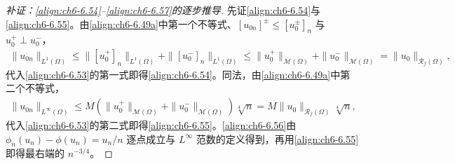 \documentclass[../../main.tex]{subfiles}%
\begin{document}
\begin{proof}[补证：\eqref{align:ch6-6.54}--\eqref{align:ch6-6.57}的逐步推导]
先证\eqref{align:ch6-6.54}与\eqref{align:ch6-6.55}。由\eqref{align:ch6-6.49a}中第一个不等式、$[u_{0n}]^\pm\leqslant[u^\pm_0]_n$ 与 $u^+_0\perp u^-_0$，
\begin{align*}
\|u_{0n}\|_{L^1(\Omega)}\leqslant\|[u^+_0]_n\|_{L^1(\Omega)}+\|[u^-_0]_n\|_{L^1(\Omega)}
\leqslant\|u^+_0\|_{\mathscr{M}(\Omega)}+\|u^-_0\|_{\mathscr{M}(\Omega)}
=\|u_0\|_{\mathscr{R}_f(\Omega)},
\end{align*}
代入\eqref{align:ch6-6.53}的第一式即得\eqref{align:ch6-6.54}。同法，由\eqref{align:ch6-6.49a}中第二个不等式，
\begin{align*}
\|u_{0n}\|_{L^\infty(\Omega)}\leqslant M(\|u^+_0\|_{\mathscr{M}(\Omega)}+\|u^-_0\|_{\mathscr{M}(\Omega)})\sqrt[4]{n}
=M\|u_0\|_{\mathscr{R}_f(\Omega)}\sqrt[4]{n},
\end{align*}
代入\eqref{align:ch6-6.53}的第二式即得\eqref{align:ch6-6.55}。\eqref{align:ch6-6.56}由 $\phi_n(u_n)-\phi(u_n)=u_n/n$ 逐点成立与 $L^\infty$ 范数的定义得到，再用\eqref{align:ch6-6.55}即得最右端的 $n^{-3/4}$。


\end{proof}
\end{document}
